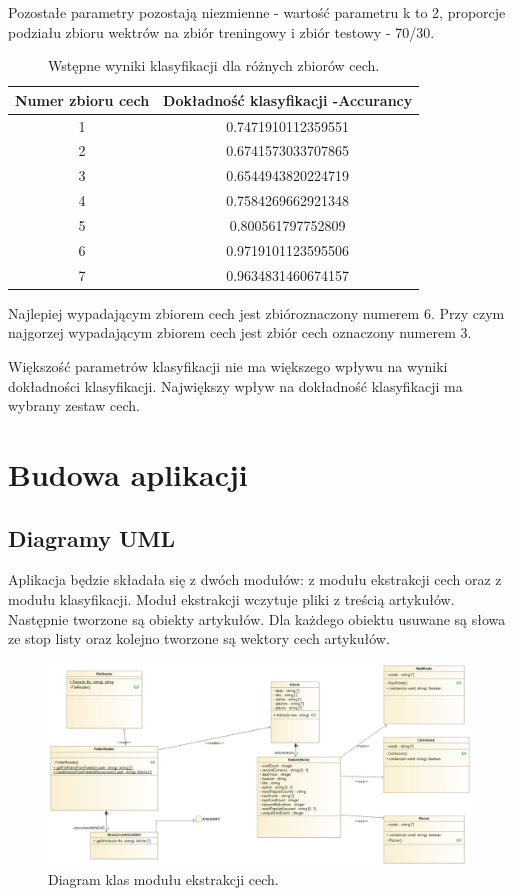 \documentclass{classrep}
\begin{document}
Pozostałe parametry pozostają niezmienne - wartość parametru k to 2, proporcje podziału zbioru wektrów na zbiór treningowy i zbiór testowy - 70/30. 

\begin{table}[h!]
 \caption{Wstępne wyniki klasyfikacji dla różnych zbiorów cech.}
 \centering
 \vspace{0.1cm}
 \begin{tabular}{c c}
  \textbf{Numer zbioru cech} & \textbf{Dokładność klasyfikacji -Accurancy}\\
\hline
  1 & 0.7471910112359551\\
  2 &  0.6741573033707865\\
  3 &  0.6544943820224719\\
  4 & 0.7584269662921348\\
5 & 0.800561797752809\\
6 &0.9719101123595506\\
7 &0.9634831460674157\\
 \end{tabular}
 \label{wyniki klasyfikacji dla roznych 10 wartosci parametru k}
\end{table}

Najlepiej wypadającym zbiorem cech jest zbióroznaczony numerem 6. Przy czym najgorzej wypadającym zbiorem cech jest zbiór cech oznaczony numerem 3. 

Większość parametrów klasyfikacji nie ma większego wpływu na wyniki dokładności klasyfikacji. Największy wpływ na dokładność klasyfikacji ma wybrany zestaw cech. 


\section{Budowa aplikacji}
\subsection{Diagramy UML}

Aplikacja będzie składała się z dwóch modułów: z modułu ekstrakcji cech oraz z modułu klasyfikacji. Moduł ekstrakcji wczytuje pliki z treścią artykułów. Następnie tworzone są obiekty artykułów. Dla każdego obiektu usuwane są słowa ze stop listy oraz kolejno tworzone są wektory cech artykułów. 

\begin{figure}[h!]
 \centering
 \includegraphics[width=14cm]{Ekstrakcja.png}
 \vspace{-0.3cm}
 \caption{Diagram klas modułu ekstrakcji cech. }
 \label{rysunek do eksperymentu 1 wariantu 1}
\end{figure}
\newpage
\end{document}
